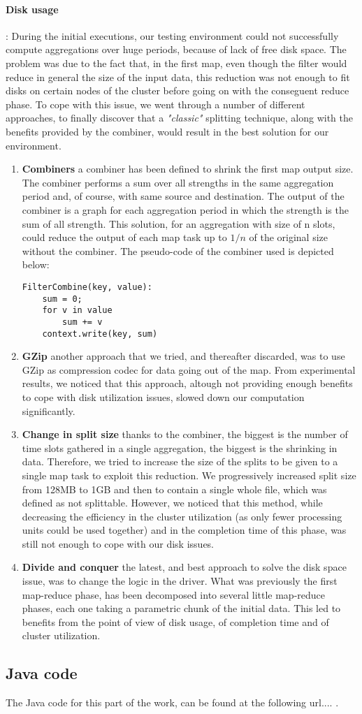 \paragraph{Disk usage}: During the initial executions, our testing environment
could not successfully compute aggregations over huge periods, because of lack of free disk space.
The problem was due to the fact that, in the first map, even though the filter would reduce in general the size of the input data,
this reduction was not enough to fit disks on certain nodes of the cluster before going on with the conseguent reduce phase.
To cope with this issue, we went through a number of different approaches, to finally discover that a \emph{"classic"} splitting technique, along with the benefits provided by the combiner, would result in the best solution for our environment.
\begin{enumerate}
\item \textbf{Combiners} a combiner has been defined to shrink the first map output size. The combiner performs a sum over all strengths in the same aggregation period and, of course, with same source and destination. 
The output of the combiner is a graph for each aggregation period in which the strength is the sum of all strength.
This solution, for an aggregation with size of n slots, could reduce the output of each map task up to $1/n$ of the original size without the combiner. 
The pseudo-code of the combiner used is depicted below:
\begin{verbatim}
FilterCombine(key, value):
	sum = 0;
	for v in value
		sum += v
	context.write(key, sum)
\end{verbatim}
\item \textbf{GZip} another approach that we tried, and thereafter discarded, was to use GZip as compression codec for data going out of the map. From experimental results, we noticed that this approach, altough not providing enough benefits
to cope with disk utilization issues, slowed down our computation significantly.
\item \textbf{Change in split size} thanks to the combiner, the biggest is the number of time slots gathered in a single aggregation, the biggest is the shrinking in data. 
Therefore, we tried to increase the size of the splits to be given to a single map task to exploit this reduction. We progressively increased split size from 128MB to 1GB and then to contain a single whole file, which was defined as not splittable.
However, we noticed that this method, while decreasing the efficiency in the cluster utilization (as only fewer processing units could be used together) and in the completion time of this phase, was still not enough to cope with our disk issues.
\item \textbf{Divide and conquer} the latest, and best approach to solve the disk space issue, was to change the logic in the driver. What was previously the first map-reduce phase, has been decomposed into several little map-reduce phases, each one taking a parametric
chunk of the initial data. This led to benefits from the point of view of disk usage, of completion time and of cluster utilization.
\end{enumerate}

\subsection{Java code}
The Java code for this part of the work, can be found at the following url.... . %

